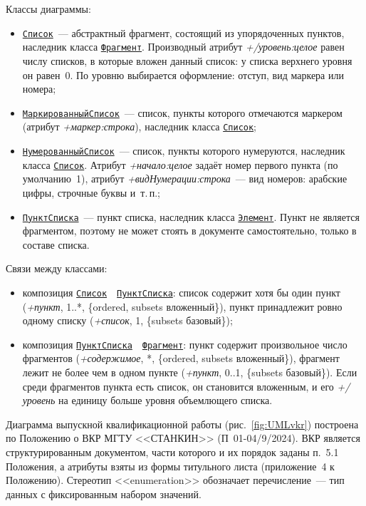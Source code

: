 Классы диаграммы:
\begin{itemize}
	\item \hyperref[fig:UMLlist]{\Verb|Список|}~--- абстрактный фрагмент, состоящий из упорядоченных пунктов, наследник класса \hyperref[fig:UMLdoc]{\Verb|Фрагмент|}. Производный атрибут \textit{+/уровень:целое} равен числу списков, в которые вложен данный список: у списка верхнего уровня он равен~0. По уровню выбирается оформление: отступ, вид маркера или номера;
	\item \hyperref[fig:UMLlist]{\Verb|МаркированныйСписок|}~--- список, пункты которого отмечаются маркером (атрибут \textit{+маркер:строка}), наследник класса \hyperref[fig:UMLlist]{\Verb|Список|};
	\item \hyperref[fig:UMLlist]{\Verb|НумерованныйСписок|}~--- список, пункты которого нумеруются, наследник класса \hyperref[fig:UMLlist]{\Verb|Список|}. Атрибут \textit{+начало:целое} задаёт номер первого пункта (по умолчанию~1), атрибут \textit{+видНумерации:строка}~--- вид номеров: арабские цифры, строчные буквы и~т.\,п.;
	\item \hyperref[fig:UMLlist]{\Verb|ПунктСписка|}~--- пункт списка, наследник класса \hyperref[fig:UMLroot]{\Verb|Элемент|}. Пункт не является фрагментом, поэтому не может стоять в документе самостоятельно, только в составе списка.
\end{itemize}

Связи между классами:
\begin{itemize}
	\item композиция \hyperref[fig:UMLlist]{\Verb|Список|}~~\hyperref[fig:UMLlist]{\Verb|ПунктСписка|}: список содержит хотя бы один пункт (\textit{+пункт}, 1..*, \{ordered, subsets вложенный\}), пункт принадлежит ровно одному списку (\textit{+список}, 1, \{subsets базовый\});
	\item композиция \hyperref[fig:UMLlist]{\Verb|ПунктСписка|}~~\hyperref[fig:UMLdoc]{\Verb|Фрагмент|}: пункт содержит произвольное число фрагментов (\textit{+содержимое}, *, \{ordered, subsets вложенный\}), фрагмент лежит не более чем в одном пункте (\textit{+пункт}, 0..1, \{subsets базовый\}). Если среди фрагментов пункта есть список, он становится вложенным, и его \textit{+/уровень} на единицу больше уровня объемлющего списка.
\end{itemize}

Диаграмма выпускной квалификационной работы (рис.~\ref{fig:UMLvkr}) построена по Положению о ВКР МГТУ <<СТАНКИН>> (П~01-04/9/2024). ВКР является структурированным документом, части которого и их порядок заданы п.~5.1 Положения, а атрибуты взяты из формы титульного листа (приложение~4 к Положению). Стереотип <<enumeration>> обозначает перечисление~--- тип данных с фиксированным набором значений.

